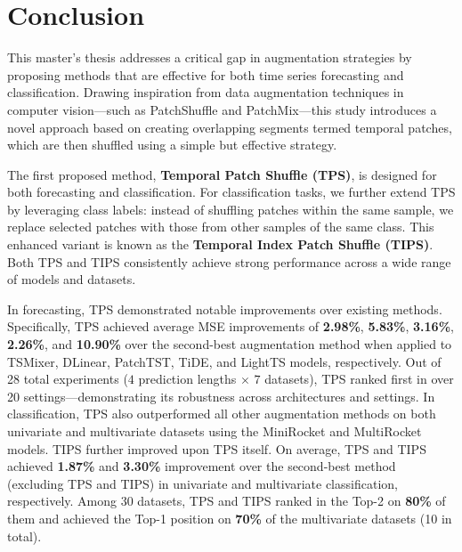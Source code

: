 \chapter{Conclusion} \label{chapter:conclusion}



This master’s thesis addresses a critical gap in augmentation strategies by proposing methods that are effective for both time series forecasting and classification. Drawing inspiration from data augmentation techniques in computer vision—such as PatchShuffle and PatchMix—this study introduces a novel approach based on creating overlapping segments termed temporal patches, which are then shuffled using a simple but effective strategy.

The first proposed method, \textbf{Temporal Patch Shuffle (TPS)}, is designed for both forecasting and classification. For classification tasks, we further extend TPS by leveraging class labels: instead of shuffling patches within the same sample, we replace selected patches with those from other samples of the same class. This enhanced variant is known as the \textbf{Temporal Index Patch Shuffle (TIPS)}. Both TPS and TIPS consistently achieve strong performance across a wide range of models and datasets.

In forecasting, TPS demonstrated notable improvements over existing methods. Specifically, TPS achieved average MSE improvements of \textbf{2.98\%}, \textbf{5.83\%}, \textbf{3.16\%}, \textbf{2.26\%}, and \textbf{10.90\%} over the second-best augmentation method when applied to TSMixer, DLinear, PatchTST, TiDE, and LightTS models, respectively. Out of 28 total experiments ($4$ prediction lengths $\times$ $7$ datasets), TPS ranked first in over 20 settings—demonstrating its robustness across architectures and settings.
In classification, TPS also outperformed all other augmentation methods on both univariate and multivariate datasets using the MiniRocket and MultiRocket models. TIPS further improved upon TPS itself. On average, TPS and TIPS achieved \textbf{1.87\%} and \textbf{3.30\%} improvement over the second-best method (excluding TPS and TIPS) in univariate and multivariate classification, respectively. Among 30 datasets, TPS and TIPS ranked in the Top-2 on \textbf{80\%} of them and achieved the Top-1 position on \textbf{70\%} of the multivariate datasets (10 in total).

